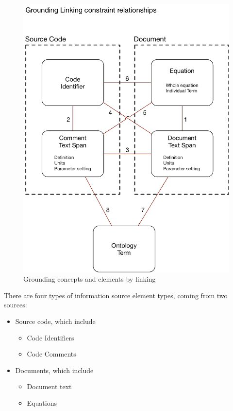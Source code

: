 \documentclass[article, 12pt, oneside]{memoir}
\begin{document}
\begin{figure}
\centering
\includegraphics{figs/grounding.png}
\caption{Grounding concepts and elements by linking}
\end{figure}

There are four types of information source element types, coming from
two sources:

\begin{itemize}
\tightlist
\item
  Source code, which include

  \begin{itemize}
  \tightlist
  \item
    Code Identifiers
  \item
    Code Comments
  \end{itemize}
\item
  Documents, which include

  \begin{itemize}
  \tightlist
  \item
    Document text
  \item
    Equations
  \end{itemize}
\end{itemize}
\end{document}
